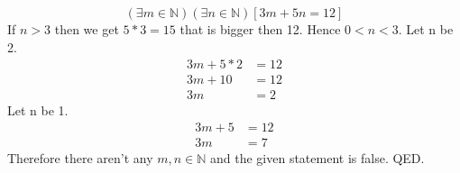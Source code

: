 \documentclass{article}
\begin{document}
$$(\exists m \in \mathbb{N})(\exists n \in \mathbb{N} )[ 3m + 5n = 12 ]$$
If $n > 3$ then we get $5 * 3 = 15$ that is bigger then 12. Hence $0 < n < 3$.
\newline
Let n be 2.
\newline
\begin{align*}
3m + 5*2 &= 12\\
3m + 10 &= 12\\
3m &= 2 \tag*{(Can't get whole m)}
\end{align*}
\newline
Let n be 1.
\newline
\begin{align*}
3m + 5 &= 12\\
3m &= 7 \tag*{(Also can't get whole m)}
\end{align*}
\newline
Therefore there aren't any $m,n \in \mathbb{N}$ and the given statement is false.
\newline
QED.
\end{document}
